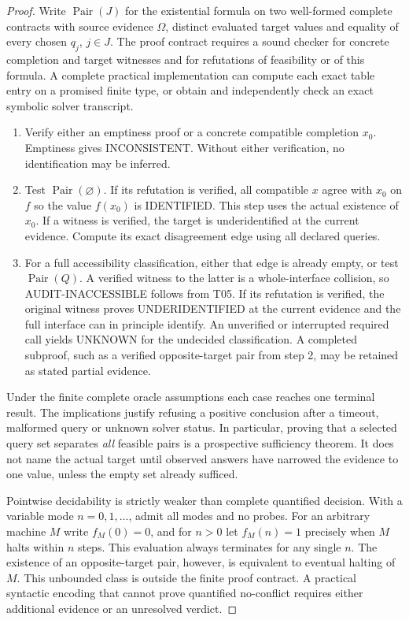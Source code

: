 \begin{proof}

Write \(\operatorname{Pair}(J)\) for the existential formula on two well-formed complete contracts with source evidence \(\Omega\), distinct evaluated target values and equality of every chosen \(q_j\), \(j\in J\). The proof contract requires a sound checker for concrete completion and target witnesses and for refutations of feasibility or of this formula. A complete practical implementation can compute each exact table entry on a promised finite type, or obtain and independently check an exact symbolic solver transcript.

\begin{enumerate}
\def\labelenumi{\arabic{enumi}.}

\item
  Verify either an emptiness proof or a concrete compatible completion \(x_0\). Emptiness gives INCONSISTENT. Without either verification, no identification may be inferred.
\item
  Test \(\operatorname{Pair}(\varnothing)\). If its refutation is verified, all compatible \(x\) agree with \(x_0\) on \(f\) so the value \(f(x_0)\) is IDENTIFIED. This step uses the actual existence of \(x_0\). If a witness is verified, the target is underidentified at the current evidence. Compute its exact disagreement edge using all declared queries.
\item
  For a full accessibility classification, either that edge is already empty, or test \(\operatorname{Pair}(Q)\). A verified witness to the latter is a whole-interface collision, so AUDIT-INACCESSIBLE follows from T05. If its refutation is verified, the original witness proves UNDERIDENTIFIED at the current evidence and the full interface can in principle identify. An unverified or interrupted required call yields UNKNOWN for the undecided classification. A completed subproof, such as a verified opposite-target pair from step 2, may be retained as stated partial evidence.
\end{enumerate}

Under the finite complete oracle assumptions each case reaches one terminal result. The implications justify refusing a positive conclusion after a timeout, malformed query or unknown solver status. In particular, proving that a selected query set separates \emph{all} feasible pairs is a prospective sufficiency theorem. It does not name the actual target until observed answers have narrowed the evidence to one value, unless the empty set already sufficed.

Pointwise decidability is strictly weaker than complete quantified decision. With a variable mode \(n=0,1,\dots\), admit all modes and no probes. For an arbitrary machine \(M\) write \(f_M(0)=0\), and for \(n>0\) let \(f_M(n)=1\) precisely when \(M\) halts within \(n\) steps. This evaluation always terminates for any single \(n\). The existence of an opposite-target pair, however, is equivalent to eventual halting of \(M\). This unbounded class is outside the finite proof contract. A practical syntactic encoding that cannot prove quantified no-conflict requires either additional evidence or an unresolved verdict.

\end{proof}

